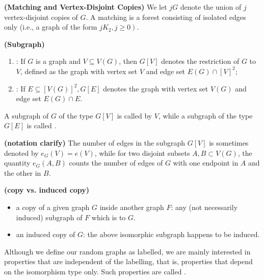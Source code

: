 \documentclass{article}
\newcommand{\bfs}[1]{\textbf{({#1}) }}
\begin{document}
\begin{defa}{\bfs{Matching and Vertex-Disjoint Copies}}
 We let $j G$ denote the union of $j$ vertex-disjoint copies of $G .$ A matching is a forest consisting of isolated edges only (i.e., a graph of the form $\left.j K_{2}, j \geq 0\right)$. 
\end{defa}
\begin{defa}{\bfs{Subgraph}}
\begin{enumerate}
    \item {}: If $G$ is a graph and $V \subseteq V(G)$, then $G[V]$ denotes the restriction of $G$ to $V$, defined as the graph with vertex set $V$ and edge set $E(G) \cap[V]^{2} ;$ 
    \item {}:  If $E \subseteq[V(G)]^{2}, G[E]$ denotes the graph with vertex set $V(G)$ and edge set $E(G) \cap E .$ 
\end{enumerate}
 A subgraph of $G$ of the type $G[V]$ is called  by $V$, while a subgraph of the type $G[E]$ is called . 
\end{defa}
\begin{rema}{\bfs{notation clarify}}
The number of edges in the subgraph $G[V]$ is sometimes denoted by $e_{G}(V)=e(V)$, while for two disjoint subsets $A, B \subset V(G)$, the quantity $e_{G}(A, B)$ counts the number of edges of $G$ with one endpoint in $A$ and the other in $B$.
\end{rema}
\begin{rema}{\bfs{copy vs. induced copy}}
\begin{itemize}
    \item a copy of a given graph $G$ inside another graph $F$:  any (not necessarily induced) subgraph of $F$ which is  to $G .$
    \item an induced copy of $G$:  the above isomorphic subgraph happens to be induced.
\end{itemize}
\end{rema}
Although we define our random graphs as labelled, we are mainly interested in properties that are independent of the labelling, that is, properties that depend on the isomorphism type only. Such properties are called .
\end{document}
